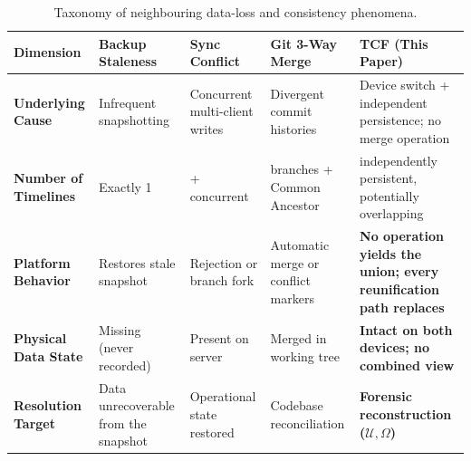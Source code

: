 
\begin{table}[htbp]
  \centering
  \caption{Taxonomy of neighbouring data-loss and consistency phenomena.}
  \label{tab:taxonomy}
  \small
  \setlength{\tabcolsep}{4pt}
  \renewcommand{\arraystretch}{1.25}
  \begin{tabularx}{\textwidth}{@{}l >{\raggedright\arraybackslash}X >{\raggedright\arraybackslash}X >{\raggedright\arraybackslash}X >{\raggedright\arraybackslash}X@{}}
    \toprule
    \textbf{Dimension} &
      \textbf{Backup Staleness} &
      \textbf{Sync Conflict} &
      \textbf{Git 3-Way Merge} &
      \textbf{TCF (This Paper)} \\
    \midrule
    \textbf{Underlying Cause} &
      Infrequent snapshotting &
      Concurrent multi-client writes &
      Divergent commit histories &
      Device switch + independent persistence; no merge operation \\

    \textbf{Number of Timelines} &
      Exactly 1 &
      2+ concurrent &
      2 branches + Common Ancestor &
      2 independently persistent, potentially overlapping \\

    \textbf{Platform Behavior} &
      Restores stale snapshot &
      Rejection or branch fork &
      Automatic merge or conflict markers &
      \textbf{No operation yields the union; every reunification path replaces} \\

    \textbf{Physical Data State} &
      Missing (never recorded) &
      Present on server &
      Merged in working tree &
      \textbf{Intact on both devices; no combined view} \\

    \textbf{Resolution Target} &
      Data unrecoverable from the snapshot &
      Operational state restored &
      Codebase reconciliation &
      \textbf{Forensic reconstruction ($\mathcal{U}, \Omega$)} \\
    \bottomrule
  \end{tabularx}
\end{table}
